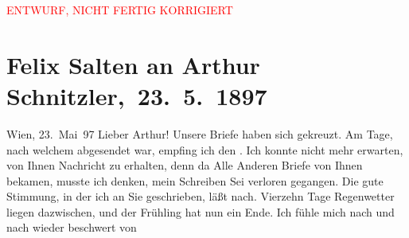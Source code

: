 
\begin{center}
            \textcolor{red}{ENTWURF, NICHT FERTIG KORRIGIERT}
                      \end{center}
            
         
         \renewcommand{\erwaehntePersonen}{Personen: Richard Beer-Hofmann,  Elisabeth von Österreich-Ungarn,  Franz Joseph I. von Österreich-Ungarn, Paul Goldmann, Hugo von Hofmannsthal, Richard Metzl, Louise Metzl, Ottilie Salten, Adele Sandrock}
         \renewcommand{\erwaehnteInstitutionen}{Institutionen: Franz-Joseph-Orden}
         \renewcommand{\erwaehnteOrte}{Orte: London, Ostsee, Paris, Riga, Russland, Wien}
         \renewcommand{\erwaehnteWerke}{}
               \section[ Felix Salten an Arthur Schnitzler, 23. 5. 1897]{ Felix Salten an Arthur Schnitzler, 23. 5. 1897}\nopagebreak{}\rehead{ }\begin{ledgroupsized}[t]{13cm}\normalsize\beginnumbering \toendnotes[C]{\smallbreak\pagebreak[2]} 
\toendnotes[C]{\smallbreak}\pstart
           \raggedleft{}{\pb}Wien, 23. Mai 97\pend
           \pstart
           Lieber Arthur! Unsere Briefe haben sich gekreuzt. Am Tage, nach
               welchem \label{K_L03266-1v}\label{K_L03266-1h} abgesendet war, empfing ich den \label{K_L03266-2v}\label{K_L03266-2h}. Ich konnte nicht mehr erwarten, von
               Ihnen Nachricht zu erhalten, denn da Alle Anderen Briefe von Ihnen bekamen, musste
               ich denken, mein Schreiben Sei verloren gegangen.\pend
           \pstart
           Die gute Stimmung, in der ich \label{K_L03266-3v}\label{K_L03266-3h} an Sie geschrieben, läßt nach. Vierzehn Tage Regenwetter liegen dazwischen,
               und der Frühling hat nun ein Ende. Ich fühle mich nach und nach wieder beschwert von

\end{ledgroupsized}
